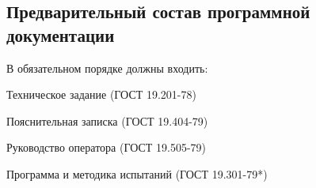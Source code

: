 \subsection{Предварительный состав программной документации}
В обязательном порядке должны входить:
\begin{my_enumerate}
\item Техническое задание  (ГОСТ 19.201-78)
\item Пояснительная записка  (ГОСТ 19.404-79)
\item Руководство оператора  (ГОСТ 19.505-79)
\item Программа и методика испытаний (ГОСТ 19.301-79*)
\end{my_enumerate}

